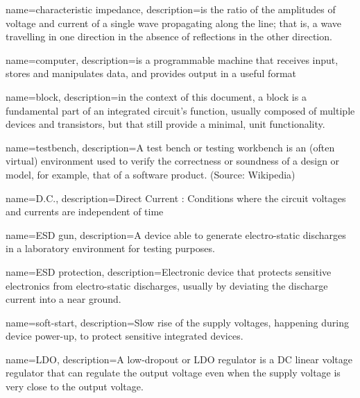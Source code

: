%
%

{
  name=characteristic impedance,
  description={is the ratio of the amplitudes of voltage and current of a
               single wave propagating along the line;
               that is, a wave travelling in one direction in the absence of
               reflections in the other direction.}
}

{
  name=computer,
  description={is a programmable machine that receives input,
               stores and manipulates data, and provides
               output in a useful format}
}

{
  name=block,
  description={in the context of this document,
               a block is a fundamental part of an integrated circuit's function,
               usually composed of multiple devices and transistors,
               but that still provide a minimal, unit functionality.}
}

{
  name=testbench,
  description={A test bench or testing workbench is an (often virtual)
               environment used to verify the correctness or soundness of a
               design or model, for example, that of a software product.
               (Source: Wikipedia)}
}

{
  name=D.C.,
  description={Direct Current : Conditions where the circuit voltages
               and currents are independent of time}
}

{
  name=ESD gun,
  description={A device able to generate electro-static discharges in a
               laboratory environment for testing purposes.}
}

{
  name=ESD protection,
  description={Electronic device that protects sensitive electronics from
               electro-static discharges, usually by deviating the discharge
               current into a near ground.}
}

{
  name=soft-start,
  description={Slow rise of the supply voltages, happening during device
  power-up, to protect sensitive integrated devices.}
}

{
  name=LDO,
  description={A low-dropout or LDO regulator is a DC linear voltage regulator
  that can regulate the output voltage even when the supply voltage
  is very close to the output voltage.}
}


